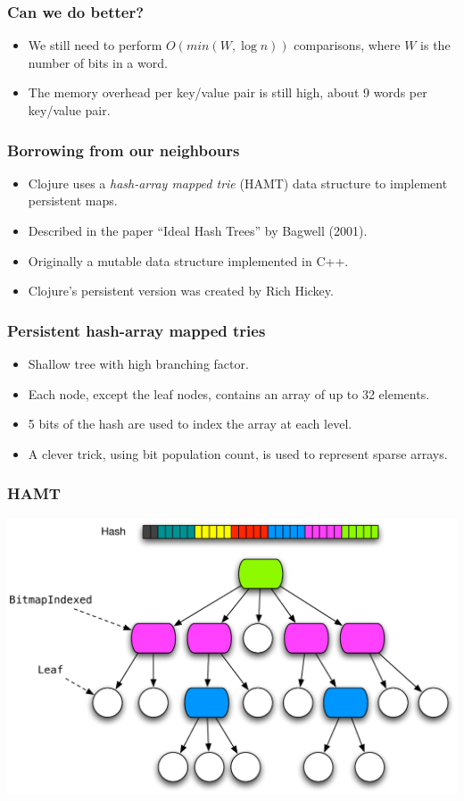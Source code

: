 \documentclass[xetex,mathserif,serif]{beamer}
\newcommand{\code}[1]{\mbox{\texttt{\small{\color{CodeColor}{#1}}}}}
\begin{document}
\begin{frame}
  \frametitle{Can we do better?}
  \begin{itemize}
  \item We still need to perform $O(min(W, \log n))$ \code{Int}
    comparisons, where $W$ is the number of bits in a word.
  \item The memory overhead per key/value pair is still high, about 9
    words per key/value pair.
  \end{itemize}
\end{frame}

\begin{frame}
  \frametitle{Borrowing from our neighbours}
  \begin{itemize}
  \item Clojure uses a \emph{hash-array mapped trie} (HAMT) data
    structure to implement persistent maps.
  \item Described in the paper ``Ideal Hash Trees'' by Bagwell (2001).
  \item Originally a mutable data structure implemented in C++.
  \item Clojure's persistent version was created by Rich Hickey.
  \end{itemize}
\end{frame}

\begin{frame}
  \frametitle{Persistent hash-array mapped tries}
  \begin{itemize}
  \item Shallow tree with high branching factor.
  \item Each node, except the leaf nodes, contains an array of up to
    32 elements.
  \item 5 bits of the hash are used to index the array at each level.
  \item A clever trick, using bit population count, is used to
    represent sparse arrays.
  \end{itemize}
\end{frame}

\begin{frame}
  \frametitle{HAMT}
  \includegraphics[width=\textwidth]{hamt.pdf}
\end{frame}
\end{document}
